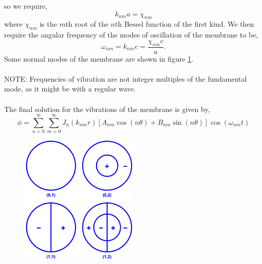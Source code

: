 \documentclass{book}
\begin{document}
so we require,
\begin{equation}
	k_{nm}a = \chi_{nm}
\end{equation}
where $\chi_{nm}$ is the $m$th root of the $n$th Bessel function of the first kind. We then require the angular frequency of the modes of oscillation of the membrane to be,
\begin{equation}
	\omega_{nm} = k_{nm}c = \frac{\chi_{nm}c}{a}.
\end{equation}
Some normal modes of the membrane are shown in figure \ref{fig:normal modes memb}.
\\\\
NOTE: Frequencies of vibration are not integer multiples of the fundamental mode, as it might be with a regular wave.
\\\\
The final solution for the vibrations of the membrane is given by,
\begin{equation}
	\phi = \sum_{n=0}^{\infty}\sum_{m=0}^{\infty}J_n(k_{nm}r)\left[A_{nm}\cos(n\theta) + B_{nm}\sin(n\theta)\right]\cos(\omega_{nm}t)
\end{equation}
\begin{figure}
	\centering
	\includegraphics[width=0.5\textwidth]{normal modes.pdf}
	\caption{}
	\label{fig:normal modes memb}
\end{figure}
\end{document}
